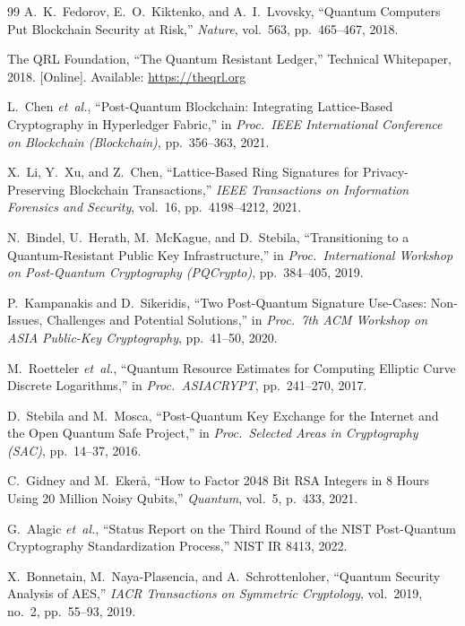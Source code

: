 \documentclass[12pt, a4paper, twocolumn]{article}
\begin{document}
\begin{thebibliography}{99}
A.~K.~Fedorov, E.~O.~Kiktenko, and A.~I.~Lvovsky, ``Quantum Computers Put Blockchain Security at Risk,'' \textit{Nature}, vol.~563, pp.~465--467, 2018.

The QRL Foundation, ``The Quantum Resistant Ledger,'' Technical Whitepaper, 2018. [Online]. Available: \url{https://theqrl.org}

L.~Chen \textit{et~al.}, ``Post-Quantum Blockchain: Integrating Lattice-Based Cryptography in Hyperledger Fabric,'' in \textit{Proc.\ IEEE International Conference on Blockchain (Blockchain)}, pp.~356--363, 2021.

X.~Li, Y.~Xu, and Z.~Chen, ``Lattice-Based Ring Signatures for Privacy-Preserving Blockchain Transactions,'' \textit{IEEE Transactions on Information Forensics and Security}, vol.~16, pp.~4198--4212, 2021.

N.~Bindel, U.~Herath, M.~McKague, and D.~Stebila, ``Transitioning to a Quantum-Resistant Public Key Infrastructure,'' in \textit{Proc.\ International Workshop on Post-Quantum Cryptography (PQCrypto)}, pp.~384--405, 2019.

P.~Kampanakis and D.~Sikeridis, ``Two Post-Quantum Signature Use-Cases: Non-Issues, Challenges and Potential Solutions,'' in \textit{Proc.\ 7th ACM Workshop on ASIA Public-Key Cryptography}, pp.~41--50, 2020.

M.~Roetteler \textit{et~al.}, ``Quantum Resource Estimates for Computing Elliptic Curve Discrete Logarithms,'' in \textit{Proc.\ ASIACRYPT}, pp.~241--270, 2017.

D.~Stebila and M.~Mosca, ``Post-Quantum Key Exchange for the Internet and the Open Quantum Safe Project,'' in \textit{Proc.\ Selected Areas in Cryptography (SAC)}, pp.~14--37, 2016.

C.~Gidney and M.~Eker\aa, ``How to Factor 2048 Bit RSA Integers in 8 Hours Using 20 Million Noisy Qubits,'' \textit{Quantum}, vol.~5, p.~433, 2021.

G.~Alagic \textit{et~al.}, ``Status Report on the Third Round of the NIST Post-Quantum Cryptography Standardization Process,'' NIST IR 8413, 2022.

X.~Bonnetain, M.~Naya-Plasencia, and A.~Schrottenloher, ``Quantum Security Analysis of AES,'' \textit{IACR Transactions on Symmetric Cryptology}, vol.~2019, no.~2, pp.~55--93, 2019.


\end{thebibliography}
\end{document}
